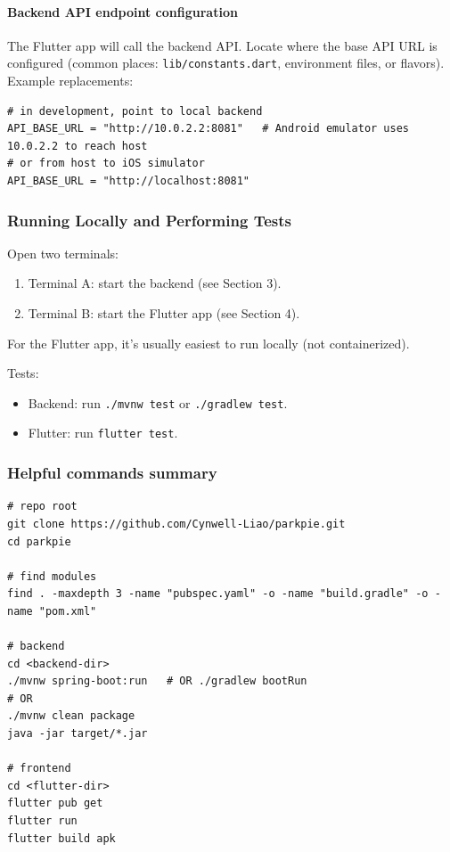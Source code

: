 \paragraph{Backend API endpoint configuration}
The Flutter app will call the backend API. Locate where the base API URL is configured (common places: \texttt{lib/constants.dart}, environment files, or flavors). Example replacements:
\begin{verbatim}
# in development, point to local backend
API_BASE_URL = "http://10.0.2.2:8081"   # Android emulator uses 10.0.2.2 to reach host
# or from host to iOS simulator
API_BASE_URL = "http://localhost:8081"
\end{verbatim}

\subsubsection{Running Locally and Performing Tests}
Open two terminals:

\begin{enumerate}
  \item Terminal A: start the backend (see Section 3).
  \item Terminal B: start the Flutter app (see Section 4).
\end{enumerate}

For the Flutter app, it's usually easiest to run locally (not containerized).

Tests:
\begin{itemize}
  \item Backend: run \texttt{./mvnw test} or \texttt{./gradlew test}.
  \item Flutter: run \texttt{flutter test}.
\end{itemize}

\subsubsection{Helpful commands summary}
\begin{verbatim}
# repo root
git clone https://github.com/Cynwell-Liao/parkpie.git
cd parkpie

# find modules
find . -maxdepth 3 -name "pubspec.yaml" -o -name "build.gradle" -o -name "pom.xml"

# backend
cd <backend-dir>
./mvnw spring-boot:run   # OR ./gradlew bootRun
# OR
./mvnw clean package
java -jar target/*.jar

# frontend
cd <flutter-dir>
flutter pub get
flutter run
flutter build apk
\end{verbatim}
